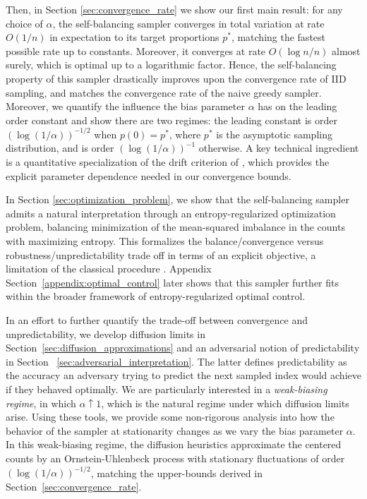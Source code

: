Then, in Section \ref{sec:convergence_rate} we show our first main result: for any choice of $\alpha$, the self-balancing sampler
converges in total variation at rate $O(1/n)$ in expectation to its target proportions $p^*$, matching the fastest possible rate up to 
constants. Moreover, it converges at rate $O(\log n / n)$ almost surely, which is optimal up to a logarithmic factor. Hence, the
self-balancing property of this sampler drastically improves upon the convergence rate of IID sampling, and matches the convergence rate of the naive greedy sampler. Moreover,
we quantify the influence the bias parameter $\alpha$ has on the leading order constant and show there are two regimes: the
leading constant is order $(\log(1/\alpha))^{-1/2}$ when $p(0) = p^*$, where $p^*$ is the asymptotic sampling distribution,
 and is order $(\log(1/\alpha))^{-1}$ otherwise. A key technical ingredient is a quantitative specialization of the drift criterion of
 \cite{pemantle1999_negative_drift_uniform_lr_bounds}, which provides the explicit parameter dependence needed
 in our convergence bounds.

In Section \ref{sec:optimization_problem}, we show that the self-balancing sampler admits a natural
interpretation through an entropy-regularized optimization problem, balancing minimization of the
mean-squared imbalance in the counts with maximizing entropy. This formalizes the balance/convergence
 versus robustness/unpredictability trade off in terms of an explicit objective, a limitation of the
 classical procedure \cite{pocock1975_sequential_treatment_assignment}.
 Appendix Section~\ref{appendix:optimal_control} later shows that this sampler further fits within the broader
 framework of entropy-regularized optimal control.

In an effort to further quantify the trade-off between convergence and unpredictability, we develop diffusion
 limits in Section~\ref{sec:diffusion_approximations} and an adversarial notion of predictability in Section
~\ref{sec:adversarial_interpretation}. The latter defines predictability as the accuracy an adversary
   trying to predict the next sampled index would achieve if they behaved optimally. We are
   particularly interested in a \emph{weak-biasing regime}, in which $\alpha \uparrow 1$, which is the
   natural regime under which diffusion limits arise. Using these tools, we provide some non-rigorous analysis
   into how the behavior of the sampler at stationarity changes as we vary the bias parameter $\alpha$.
In this weak-biasing regime, the diffusion heuristics approximate the centered counts by an Ornstein-Uhlenbeck process with stationary
fluctuations of order $(\log(1/\alpha))^{-1/2}$, matching the upper-bounds derived in Section~\ref{sec:convergence_rate}.


